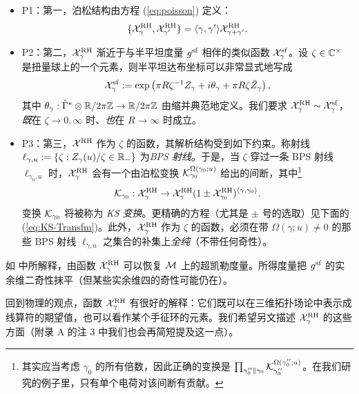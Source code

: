 \begin{itemize}

\item P1：第一，泊松结构由方程 (\ref{eq:poisson}) 定义：
\begin{equation}
\{ \CX^\RH_{\gamma}, \CX^\RH_{\gamma'} \} = \langle \gamma,\gamma' \rangle \CX^\RH_{\gamma+\gamma'}. \label{eq:poisson}
\end{equation}

\item P2：第二，$\CX^\RH_{\gamma}$ 渐近于与半平坦度量 $g^{\sf}$ 相伴的类似函数 $\CX_{\gamma}^{\sf}$。设 $\zeta \in \IC^\times$ 是扭量球上的一个元素，则半平坦达布坐标可以非常显式地写成
\begin{equation}\label{eq:P2-sf}
\CX_{\gamma}^{\sf} := \exp \left( \pi R\zeta^{-1} Z_\gamma + i \theta_\gamma + \pi R \zeta \bar Z_\gamma \right),
\end{equation}
其中 $\theta_\gamma: \hat \Gamma^*\otimes \IR/2\pi \IZ \to \IR/2\pi \IZ$ 由缩并典范地定义。我们要求 $\CX_{\gamma}^\RH \sim \CX_{\gamma}^{\rm sf}$，\emph{既}在 $\zeta\to 0, \infty$ 时、\emph{也}在 $R\to \infty$ 时成立。

\item P3：第三，$\CX^\RH$ 作为 $\zeta$ 的函数，其解析结构受到如下约束。称射线 $\ell_{\gamma,u} := \{ \zeta: Z_\gamma(u)/\zeta \in \IR_-\}$ 为\emph{BPS 射线}。于是，当 $\zeta$ 穿过一条 BPS 射线 $\ell_{\gamma_0,u}$ 时，$\CX^\RH_{\gamma}$ 会有一个由泊松变换 $\CK_{\gamma_0}^{\Omega(\gamma_0;u)}$ 给出的间断，其中\footnote{其实应当考虑 $\gamma_0$ 的所有倍数，因此正确的变换是 $\prod_{\gamma_0'' \parallel \gamma_0} \CK_{\gamma_0''}^{\Omega(\gamma_0'';u)}$。在我们研究的例子里，只有单个电荷对该间断有贡献。}
\begin{equation}
\CK_{\gamma_0} : \CX^\RH_\gamma \to \CX^\RH_{\gamma} (1 \pm \CX^\RH_{\gamma_0} )^{\langle \gamma, \gamma_0 \rangle}. \label{eq:KS-Transfm}
\end{equation}
变换 $\CK_{\gamma_0}$ 将被称为 \emph{KS 变换}。更精确的方程（尤其是 $\pm$ 号的选取）见下面的 (\ref{eq:KS-Transfm})。此外，$\CX_\gamma^\RH$ 作为 $\zeta$ 的函数，必须在带 $\Omega(\gamma;u) \not=0$ 的那些 BPS 射线 $\ell_{\gamma,u}$ 之集合的补集上\emph{全纯}（不带任何奇性）。
\end{itemize}

如 \cite{Gaiotto:2008cd} 中所解释，由函数 $\CX^\RH_{\gamma}$ 可以恢复 $\CM$ 上的超凯勒度量。所得度量把 $g^{\sf}$ 的实余维二奇性抹平（但某些实余维四的奇性可能仍在）。

回到物理的观点，函数 $\CX^\RH_{\gamma}$ 有很好的解释：它们既可以在三维拓扑场论中表示成线算符的期望值，也可以看作某个手征环的元素。我们希望另文描述 $\CX^\RH_\gamma$ 的这些方面（附录 A 的注 3 中我们也会再简短提及这一点）。


